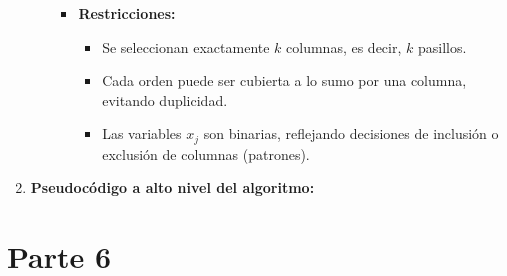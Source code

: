 \documentclass[a4paper,12pt]{article}
\begin{document}
\begin{enumerate}[label=(\alph*), leftmargin=2em]
\begin{enumerate}[label=\roman*., leftmargin=0.2em]
\begin{itemize}
                \item \textbf{Restricciones:}
                \begin{itemize}
                    \item Se seleccionan exactamente \(k\) columnas, es decir, \(k\) pasillos.
                    \item Cada orden puede ser cubierta a lo sumo por una columna, evitando duplicidad.
                    \item Las variables \(x_j\) son binarias, reflejando decisiones de inclusión o exclusión de columnas (patrones).
                \end{itemize}
            \end{itemize}

    \end{enumerate}

    \item \textbf{Pseudocódigo a alto nivel del algoritmo:}
\end{enumerate}

\clearpage

\section{Parte 6}
\label{sec:variante6}
\end{document}
